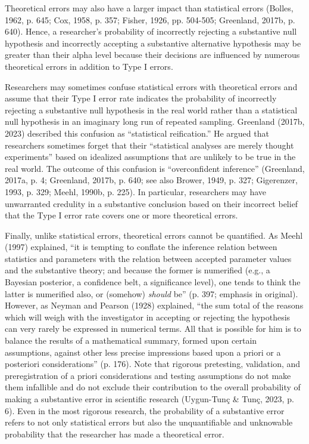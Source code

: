 \documentclass[authordate, empirical]{jote-new-article}
\begin{document}
	Theoretical errors may also have a larger impact than statistical errors (Bolles, 1962, p. 645; Cox, 1958, p. 357; Fisher, 1926, pp. 504-505; Greenland, 2017b, p. 640). Hence, a researcher's probability of incorrectly rejecting a substantive null hypothesis and incorrectly accepting a substantive alternative hypothesis may be greater than their alpha level because their decisions are influenced by numerous theoretical errors in addition to Type I errors.



	Researchers may sometimes confuse statistical errors with theoretical errors and assume that their Type I error rate indicates the probability of incorrectly rejecting a substantive null hypothesis in the real world rather than a statistical null hypothesis in an imaginary long run of repeated sampling. Greenland (2017b, 2023) described this confusion as “statistical reification.” He argued that researchers sometimes forget that their “statistical analyses are merely thought experiments” based on idealized assumptions that are unlikely to be true in the real world. The outcome of this confusion is “overconfident inference” (Greenland, 2017a, p. 4; Greenland, 2017b, p. 640; see also Brower, 1949, p. 327; Gigerenzer, 1993, p. 329; Meehl, 1990b, p. 225). In particular, researchers may have unwarranted credulity in a substantive conclusion based on their incorrect belief that the Type I error rate covers one or more theoretical errors.



	Finally, unlike statistical errors, theoretical errors cannot be quantified. As Meehl (1997) explained, “it is tempting to conflate the inference relation between statistics and parameters with the relation between accepted parameter values and the substantive theory; and because the former is numerified (e.g., a Bayesian posterior, a confidence belt, a significance level), one tends to think the latter is numerified also, or (somehow) \emph{should} be” (p. 397; emphasis in original). However, as Neyman and Pearson (1928) explained, “the sum total of the reasons which will weigh with the investigator in accepting or rejecting the hypothesis can very rarely be expressed in numerical terms. All that is possible for him is to balance the results of a mathematical summary, formed upon certain assumptions, against other less precise impressions based upon a priori or a posteriori considerations” (p. 176). Note that rigorous pretesting, validation, and preregistration of a priori considerations and testing assumptions do not make them infallible and do not exclude their contribution to the overall probability of making a substantive error in scientific research (Uygun-Tunç \& Tunç, 2023, p. 6). Even in the most rigorous research, the probability of a substantive error refers to not only statistical errors but also the unquantifiable and unknowable probability that the researcher has made a theoretical error.
\end{document}
